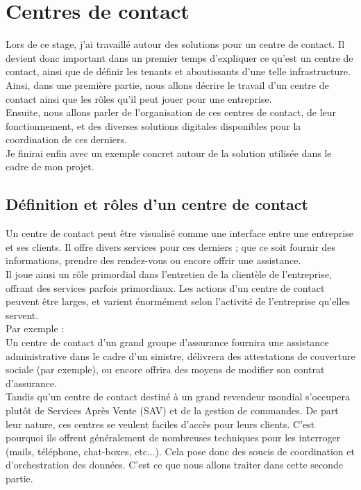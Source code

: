 \documentclass{rapport}
\begin{document}
\newpage

\section{Centres de contact}

Lors de ce stage, j'ai travaillé autour des solutions pour un centre de contact. Il devient donc important dans un premier temps d'expliquer ce qu'est un centre de contact, ainsi que de définir les tenants et aboutissants d'une telle infrastructure.\\
Ainsi, dans une première partie, nous allons décrire le travail d'un centre de contact ainsi que les rôles qu'il peut jouer pour une entreprise.\\
Ensuite, nous allons parler de l'organisation de ces centres de contact, de leur fonctionnement, et des diverses solutions digitales disponibles pour la coordination de ces derniers.\\
Je finirai enfin avec un exemple concret autour de la solution utilisée dans le cadre de mon projet.

\subsection{Définition et rôles d'un centre de contact}

Un centre de contact peut être visualisé comme une interface entre une entreprise et ses clients. Il offre divers services pour ces derniers ; que ce soit fournir des informations, prendre des rendez-vous ou encore offrir une assistance.\\

Il joue ainsi un rôle primordial dans l'entretien de la clientèle de l'entreprise, offrant des services parfois primordiaux.
Les actions d'un centre de contact peuvent être larges, et varient énormément selon l'activité de l'entreprise qu'elles servent.\\

Par exemple :\\
Un centre de contact d'un grand groupe d'assurance fournira une assistance administrative dans le cadre d'un sinistre, délivrera des attestations de couverture sociale (par exemple), ou encore offrira des moyens de modifier son contrat d'assurance.\\
Tandis qu'un centre de contact destiné à un grand revendeur mondial s'occupera plutôt de Services Après Vente (SAV) et de la gestion de commandes.
De part leur nature, ces centres se veulent faciles d'accès pour leurs clients. C'est pourquoi ils offrent généralement de nombreuses techniques pour les interroger (mails, téléphone, chat-boxes, etc...). Cela pose donc des soucis de coordination et d'orchestration des données.
C'est ce que nous allons traiter dans cette seconde partie.
\end{document}
